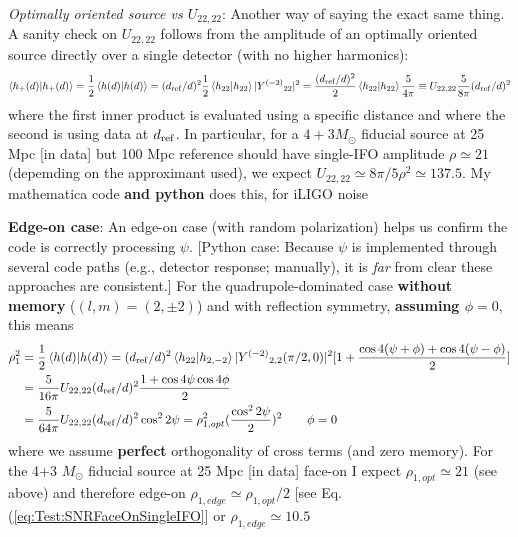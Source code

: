 \documentclass[twocolumn,prd,nofootinbib]{revtex4}
\newcommand\Y[1]{Y^{(#1)}{}}
\newcommand\qmstateproduct[2]{\left\langle#1|#2\right\rangle}
\begin{document}
\begin{widetext}
\begin{widetext}
\begin{itemize}
\begin{shaded}
\noindent \emph{Optimally oriented source vs $U_{22,22}$}: Another way of saying the exact same thing.  A sanity check on $U_{22,22}$ follows from the
amplitude of an optimally oriented source directly over a single detector (with no higher harmonics):
\begin{eqnarray}
\qmstateproduct{h_+(d)}{h_+(d)} = \frac{1}{2} \qmstateproduct{h(d)}{h(d)} 
= (d_{\rm ref}/d)^2\frac{1}{2}\qmstateproduct{h_{22}}{h_{22}} |\Y{-2}_{22}|^2
=\frac{(d_{\rm ref}/d)^2}{2} \qmstateproduct{h_{22}}{h_{22}} \frac{5}{4\pi} \nonumber 
\equiv  U_{22,22} \frac{5}{8\pi} (d_{\rm ref}/d)^2
\label{eq:Test:SNRFaceOnSingleIFO}
\end{eqnarray}
where the first inner product is evaluated using a specific distance and where the second is using data at $d_{\rm
  ref}$. 
In particular, for a $4+3 M_\odot$ fiducial source at 25 Mpc [in data] but 100 Mpc reference should have single-IFO amplitude $\rho\simeq 21$
(depemding on the approximant used), we expect $U_{22,22}\simeq 8\pi/5 \rho^2 \simeq 137.5$.  My mathematica code
\textbf{and python} does
this, for iLIGO noise

\noindent \textbf{Edge-on case}: An edge-on case (with random polarization) helps us confirm the code is correctly
processing $\psi$.  [Python case: Because $\psi$ is implemented through several code paths (e.g., detector response; manually), it is
\emph{far} from clear these approaches are consistent.]
For the quadrupole-dominated case \textbf{without memory} ($(l,m)=(2,\pm 2)$) and with reflection symmetry,
\textbf{assuming $\phi=0$}, this means
\begin{align}
\rho_1^2 &= \frac{1}{2}\qmstateproduct{h(d)}{h(d)} 
=  (d_{\rm ref}/d)^2 \qmstateproduct{h_{22}}{h_{2,-2}}|\Y{-2}_{2,2}(\pi/2,0)|^2[1+ \frac{\cos 4(\psi+\phi) + \cos 4(\psi-\phi)}{2}] 
\\ &
= \frac{5}{16\pi}U_{22,22}(d_{\rm   ref}/d)^2\frac{1+\cos 4\psi \cos 4\phi}{2} \nonumber \\
 &= \frac{5}{64\pi}U_{22,22}(d_{\rm   ref}/d)^2 \cos^2 2\psi = \rho_{1,opt}^2 (\frac{\cos^22\psi}{2})^2 \qquad \phi=0
\label{eq:ConsistencyTest:SingleIFO:PsiPhi}
\end{align}
where we assume \textbf{perfect} orthogonality of cross terms (and zero memory). 
For the 4+3 $M_\odot$ fiducial source at 25 Mpc [in data] face-on I expect $\rho_{1,opt}\simeq 21$ (see above) and
therefore edge-on $\rho_{1,edge}\simeq \rho_{1,opt}/2$ [see Eq. (\ref{eq:Test:SNRFaceOnSingleIFO}] or
$\rho_{1,edge}\simeq 10.5$


\end{shaded}
\end{itemize}
\end{widetext}
\end{widetext}
\end{document}
